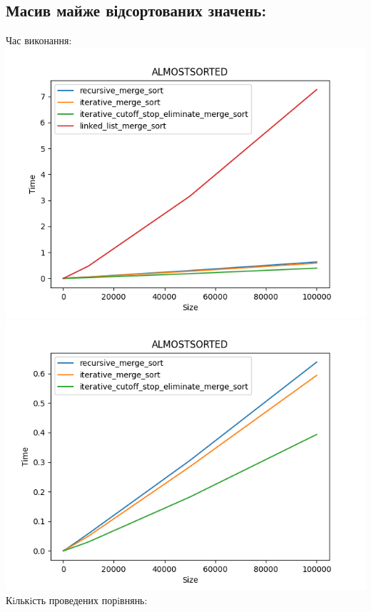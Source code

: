 \documentclass{article}
\begin{document}
    \subsection{Масив майже відсортованих значень:}
    Час виконання:
    \newline
        \includegraphics[scale=0.5]{almostsorted_Time_4_sorts_6_numbers_50_100to100000.png}
        \includegraphics[scale=0.5]{almostsorted_Time_3_sorts_6_numbers_50_100to100000.png}
    \newline
    Кiлькiсть проведених порiвнянь:
    \newline
\end{document}
